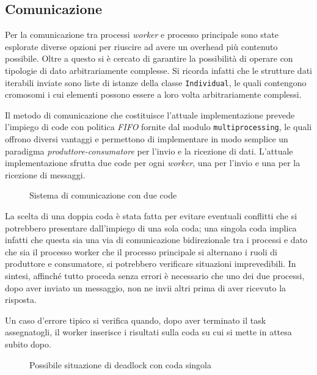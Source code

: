 \subsection{Comunicazione}

Per la comunicazione tra processi \textit{worker} e processo principale sono
state esplorate diverse opzioni per riuscire ad avere un overhead più contenuto
possibile. Oltre a questo si è cercato di garantire la possibilità di operare
con tipologie di dato arbitrariamente complesse. Si ricorda infatti che le
strutture dati iterabili inviate sono liste di istanze della classe
\verb|Individual|, le quali contengono cromosomi i cui elementi possono essere
a loro volta arbitrariamente complessi.

Il metodo di comunicazione che costituisce l'attuale implementazione prevede
l'impiego di code con politica \textit{FIFO} fornite dal modulo
\verb|multiprocessing|, le quali offrono diversi vantaggi e permettono di
implementare in modo semplice un paradigma \textit{produttore-consumatore} per
l'invio e la ricezione di dati. L'attuale implementazione sfrutta due code per
ogni \textit{worker}, una per l'invio e una per la ricezione di messaggi.

\begin{figure}[H]
	\centering
	
	\caption{Sistema di comunicazione con due code}
	\label{fig: double_queue}
\end{figure}

La scelta di una doppia coda è stata fatta per evitare eventuali conflitti
che si potrebbero presentare dall'impiego di una sola coda; una singola coda
implica infatti che questa sia una via di comunicazione bidirezionale tra i
processi e dato che sia il processo worker che il processo principale si
alternano i ruoli di produttore e consumatore, si potrebbero verificare
situazioni imprevedibili. In sintesi, affinché tutto proceda senza errori è
necessario che uno dei due processi, dopo aver inviato un messaggio, non ne
invii altri prima di aver ricevuto la risposta.

Un caso d'errore tipico si verifica quando, dopo aver terminato il task
assegnatogli, il worker inserisce i risultati sulla coda su cui si mette in
attesa subito dopo.

\begin{figure}[H]
	\centering
	
	\caption{Possibile situazione di deadlock con coda singola}
	\label{fig: deadlock}
\end{figure}

